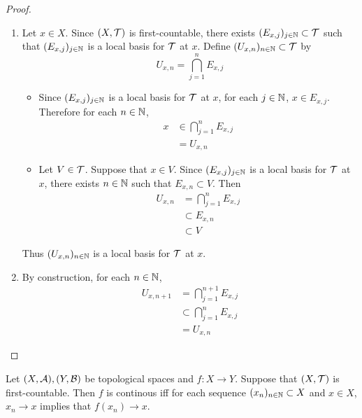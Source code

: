 \documentclass{book}
\begin{document}
	\begin{proof}\
		\begin{enumerate}
			\item Let $x \in X$. Since $(X, \mathcal{T})$ is first-countable, there exists $(E_{x, j})_{j \in \mathbb{N}} \subset \mathcal{T}$ such that $(E_{x, j})_{j \in \mathbb{N}}$ is a local basis for $\mathcal{T}$ at $x$. Define $(U_{x,n})_{n \in \mathbb{N}} \subset \mathcal{T}$ by 
			$$U_{x,n} = \bigcap_{j=1}^n E_{x,j}$$
			\begin{itemize}
				\item Since $(E_{x,j})_{j \in \mathbb{N}}$ is a local basis for $\mathcal{T}$ at $x$, for each $j \in \mathbb{N}$, $x \in E_{x,j}$. Therefore for each $n \in \mathbb{N}$, 
				\begin{align*}
					x 
					& \in \bigcap_{j=1}^n E_{x, j} \\
					& = U_{x,n}
				\end{align*}
				\item Let $V \in \mathcal{T}$. Suppose that $x \in V$. Since $(E_{x,j})_{j \in \mathbb{N}}$ is a local basis for $\mathcal{T}$ at $x$, there exists $n \in \mathbb{N}$ such that $E_{x,n} \subset V$. Then 
				\begin{align*}
					U_{x,n}
					& = \bigcap_{j=1}^n E_{x, j} \\
					& \subset E_{x, n} \\
					& \subset V
				\end{align*}
			\end{itemize}
			Thus $(U_{x,n})_{n \in \mathbb{N}}$ is a local basis for $\mathcal{T}$ at $x$. 
			\item By construction, for each $n \in \mathbb{N}$,
			\begin{align*}
				U_{x, n+1}
				& = \bigcap_{j=1}^{n+1} E_{x, j} \\
				& \subset \bigcap_{j=1}^n E_{x, j} \\
				& = U_{x, n}
			\end{align*}
		\end{enumerate}
	\end{proof}

	\begin{ex}
		Let $(X, \mathcal{A}), (Y, \mathcal{B})$ be topological spaces and $f: X \rightarrow Y$. Suppose that $(X, \mathcal{T})$ is first-countable. Then $f$ is continous iff for each sequence $(x_n)_{n \in \mathbb{N}} \subset X$ and $x \in X$, $x_n \rightarrow x$ implies that $f(x_n) \rightarrow x$.
	\end{ex}
\end{document}
